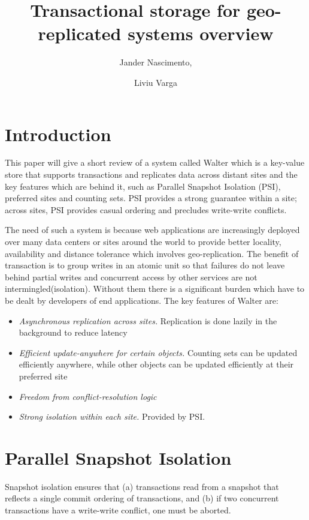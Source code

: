 \documentclass[a4paper]{article}
\begin{document}
\title{Transactional storage for geo-replicated systems overview}

\author{Jander Nascimento,
\and Liviu Varga}

\maketitle



\section{Introduction}
This paper will give a short review of a system called Walter which is a key-value store that supports transactions and replicates data across distant sites and the key features which are behind it, such as Parallel Snapshot Isolation (PSI), preferred sites and counting sets. PSI provides a strong guarantee within a site; across sites, PSI provides casual ordering and precludes write-write conflicts.

The need of such a system is because web applications are increasingly deployed over many data centers or sites around the world to provide better locality, availability and distance tolerance which involves geo-replication. The benefit of transaction is to group writes in an atomic unit so that failures do not leave behind partial writes and concurrent access by other services are not intermingled(isolation). Without them there is a significant burden which have to be dealt by developers of end applications. The key features of Walter are:
\begin{itemize}
\item \textit{Asynchronous replication across sites.} Replication is done lazily in the background to reduce latency
\item \textit{Efficient update-anywhere for certain objects.} Counting sets can be updated efficiently anywhere, while other objects can be updated efficiently at their preferred site
\item \textit{Freedom from conflict-resolution logic}
\item \textit{Strong isolation within each site.} Provided by PSI.
\end{itemize}
          
\section{Parallel Snapshot Isolation}
Snapshot isolation ensures that (a) transactions read from a snapshot that reflects a single commit ordering of transactions, and (b) if two concurrent transactions have a write-write conflict, one must be aborted.
 
\end{document}
